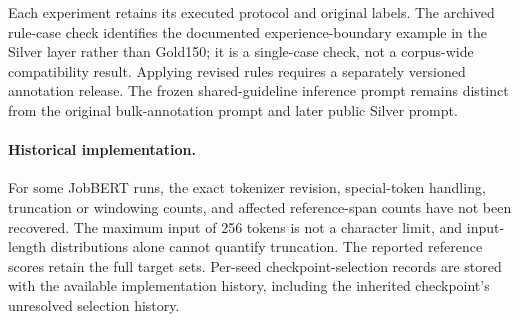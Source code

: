 Each experiment retains its executed protocol and original labels. The archived rule-case check identifies the documented experience-boundary example in the Silver layer rather than Gold150; it is a single-case check, not a corpus-wide compatibility result. Applying revised rules requires a separately versioned annotation release. The frozen shared-guideline inference prompt remains distinct from the original bulk-annotation prompt and later public Silver prompt.

\paragraph{Historical implementation.}
For some JobBERT runs, the exact tokenizer revision, special-token handling, truncation or windowing counts, and affected reference-span counts have not been recovered. The maximum input of 256 tokens is not a character limit, and input-length distributions alone cannot quantify truncation. The reported reference scores retain the full target sets. Per-seed checkpoint-selection records are stored with the available implementation history, including the inherited checkpoint's unresolved selection history.
